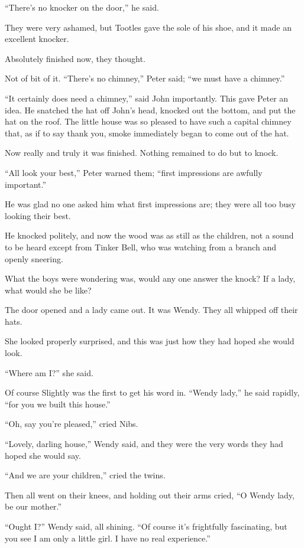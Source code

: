 “There’s no knocker on the door,” he said.

They were very ashamed, but Tootles gave the sole of his shoe,
and it made an excellent knocker.

Absolutely finished now, they thought.

Not of bit of it.
“There’s no chimney,” Peter said;
“we must have a chimney.”

“It certainly does need a chimney,” said John importantly.
This gave Peter an idea.
He snatched the hat off John’s head, knocked out the bottom, and put the hat on the roof.
The little house was so pleased to have such a capital chimney that,
as if to say thank you, smoke immediately began to come out of the hat.

Now really and truly it was finished.
Nothing remained to do but to knock.

“All look your best,” Peter warned them;
“first impressions are awfully important.”

He was glad no one asked him what first impressions are;
they were all too busy looking their best.

He knocked politely, and now the wood was as still as the children,
not a sound to be heard except from Tinker Bell,
who was watching from a branch and openly sneering.

What the boys were wondering was, would any one answer the knock?
If a lady, what would she be like?

The door opened and a lady came out.
It was Wendy.
They all whipped off their hats.

She looked properly surprised, and this was just how they had hoped she would look.

“Where am I?\@” she said.

Of course Slightly was the first to get his word in.
“Wendy lady,” he said rapidly, “for you we built this house.”

“Oh, say you’re pleased,” cried Nibs.

“Lovely, darling house,” Wendy said, and they were the very words they had hoped she would say.

“And we are your children,” cried the twins.

Then all went on their knees, and holding out their arms cried, “O Wendy lady, be our mother.”

“Ought I?\@” Wendy said, all shining.
“Of course it’s frightfully fascinating, but you see I am only a little girl.
I have no real experience.”

